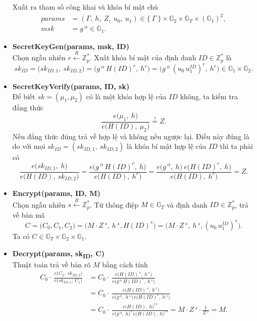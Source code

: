 \documentclass[class=report, crop=false]{standalone}
\begin{document}
\begin{itemize}[leftmargin=1cm, itemindent=-1cm]
			Xuất ra tham số công khai và khóa bí mật chủ
			\begin{align*}
				params &= (\Gamma,\ h,\ Z,\ u_0,\ u_1) \in \{\ \Gamma \ \} \times \mathbb{G}_2 \times \mathbb{G}_T \times (\mathbb{G}_1)^2, \\
				msk &= g\,^\alpha \in \mathbb{G}_1.
			\end{align*}
			\item[] {\sffamily\bfseries SecretKeyGen(params, msk, ID)} \\
			Chọn ngẫu nhiên $r \xleftarrow{R} \mathbb{Z}_p^*$. Xuất khóa bí mật của định danh $ID \in \mathbb{Z}_p^*$ là
			\[
				sk_{ID} = \Big(sk_{ID, 1},\ sk_{ID, 2} \Big) = \Big(g\,^\alpha\, H(ID)^r,\ h^r \Big) = \Big(g\,^\alpha\, (u_0 \, u_1^{ID})^r,\ h^r \Big) \in \mathbb{G}_1 \times \mathbb{G}_2.
			\]
			\item[] {\sffamily\bfseries SecretKeyVerify(params, ID, sk)} \\
			Để biết $sk = (\mu_1, \mu_2)$ có là một khóa hợp lệ của $ID$ không, ta kiểm tra đẳng thức
			\[
				\frac{e \Big(\mu_1,\ h \Big)}{e \Big(H(ID),\ \mu_2 \Big)} \overset{?}{=} Z.
			\]
			Nếu đẳng thức đúng trả về hợp lệ và không nếu ngược lại. Điều này đúng là do với mọi $sk_{ID} = (sk_{ID, 1},\ sk_{ID, 2})$ là khóa bí mật hợp lệ của $ID$ thì ta phải có
			\[
				\frac{e \Big(sk_{ID, 1},\ h \Big)}{e \Big(H(ID),\ sk_{ID, 2} \Big)} =
				\frac{e \Big(g\,^\alpha\, H(ID)^r,\ h \Big)}{e \Big(H(ID),\ h^r \Big)} =
				\frac{e \Big(g\,^\alpha,\ h \Big)\ e \Big(H(ID)^r,\ h \Big)}{e \Big(H(ID),\ h^r \Big)} = Z.
			\]
			\item[] {\sffamily\bfseries Encrypt(params, ID, M)} \\
			Chọn ngẫu nhiên $s \xleftarrow{R} \mathbb{Z}_p^*$. Từ thông điệp $M \in \mathbb{G}_T$ và định danh $ID \in \mathbb{Z}_p^*$, trả về bản mã
			\[
				C = \Big(C_0, C_1, C_2 \Big) = \Big(M \cdot Z\,^s,\ h\,^s, H(ID)^s \Big) = \Big(M \cdot Z\,^s,\ h\,^s, (u_0 \, u_1^{ID})^s \Big).
			\]
			Ta có $C \in \mathbb{G}_T \times \mathbb{G}_2 \times \mathbb{G}_1$.
			\item[] {\sffamily\bfseries Decrypt(params, sk\textsubscript{ID}, C)} \\
			Thuật toán trả về bản rõ $M$ bằng cách tính
			\begin{align*}
				C_0 \cdot\ \frac{e \Big(C_2,\ sk_{ID, 2} \Big)}{e \Big(sk_{ID, 1},\ C_1 \Big)} &=
				C_0 \cdot\ \frac{e \Big(H(ID)\,^s,\ h\,^r \Big)}{e \Big(g\,^\alpha\, H(ID)^r,\ h\,^s \Big)} \\ &=
				C_0 \cdot\ \frac{e \Big(H(ID)\,^s,\ h\,^r \Big)}{e \Big(g\,^\alpha,\ h\,^s \Big)\, e \Big(H(ID)^r,\ h\,^s \Big)} \\ &=
				C_0 \cdot\ \frac{e \Big(H(ID),\ h \Big)^{rs}}{e \Big(g\,^\alpha,\ h \Big)^s\, e \Big(H(ID),\ h \Big)^{rs}} = M \cdot Z\,^s \cdot \frac{1}{Z\,^s} = M.
			\end{align*}
		\end{itemize}
		
\end{document}
